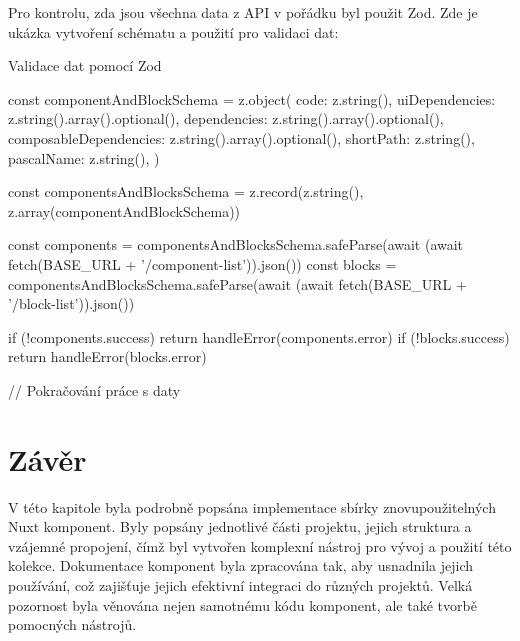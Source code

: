 \clearpage

Pro kontrolu, zda jsou všechna data z API v pořádku byl použit Zod. Zde je ukázka vytvoření schématu a použití pro validaci dat:

\begin{listing}[H]
    \caption{Validace dat pomocí Zod}
    \label{lst:cli-install}
    \begin{code}
const componentAndBlockSchema = z.object({
  code: z.string(),
  uiDependencies: z.string().array().optional(),
  dependencies: z.string().array().optional(),
  composableDependencies: z.string().array().optional(),
  shortPath: z.string(),
  pascalName: z.string(),
})

const componentsAndBlocksSchema = z.record(z.string(), z.array(componentAndBlockSchema))

const components = componentsAndBlocksSchema.safeParse(await (await fetch(BASE_URL + '/component-list')).json())
const blocks = componentsAndBlocksSchema.safeParse(await (await fetch(BASE_URL + '/block-list')).json())

if (!components.success) {
    return handleError(components.error)
}
if (!blocks.success) {
    return handleError(blocks.error)
}

// Pokračování práce s daty
\end{code}
\end{listing}

\section{Závěr}
V této kapitole byla podrobně popsána implementace sbírky znovupoužitelných Nuxt komponent. Byly popsány jednotlivé části projektu, jejich struktura a vzájemné propojení, čímž byl vytvořen komplexní nástroj pro vývoj a použití této kolekce. Dokumentace komponent byla zpracována tak, aby usnadnila jejich používání, což zajišťuje jejich efektivní integraci do různých projektů. Velká pozornost byla věnována nejen samotnému kódu komponent, ale také tvorbě pomocných nástrojů.